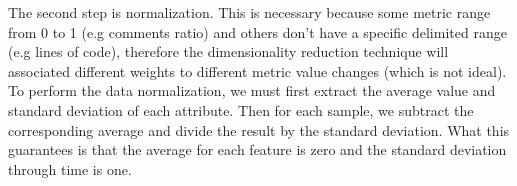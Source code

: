 The second step is normalization. This is necessary because some metric range from 0 to 1 (e.g comments ratio) and others don't have a specific delimited range (e.g lines of code), therefore the dimensionality reduction technique will associated different weights to different metric value changes (which is not ideal). To perform the data normalization, we must first extract the average value and standard deviation of each attribute. Then for each sample, we subtract the corresponding average and divide the result by the standard deviation. What this guarantees is that the average for each feature is zero and the standard deviation through time is one.
